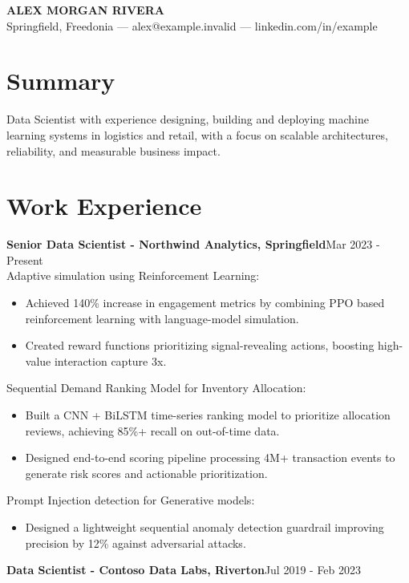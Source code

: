 \documentclass[10pt]{article}
\newcommand{\entry}[2]{{\bfseries #1}\hfill {#2}\\[-0.3em]}
\newcommand{\proj}[1]{\vspace{1pt}#1:\\[-0.4em]}
\begin{document}
\begin{center}
{\LARGE\bfseries ALEX MORGAN RIVERA}\\[2pt]
Springfield, Freedonia --- alex@example.invalid --- linkedin.com/in/example
\end{center}
\vspace{-4pt}

\section{Summary}
Data Scientist with experience designing, building and deploying machine learning systems in logistics and retail, with a focus on scalable architectures, reliability, and measurable business impact.

\section{Work Experience}
\entry{Senior Data Scientist - Northwind Analytics, Springfield}{Mar 2023 - Present}

\proj{Adaptive simulation using Reinforcement Learning}
\begin{itemize}
\item Achieved 140\% increase in engagement metrics by combining PPO based reinforcement learning with language-model simulation.
\item Created reward functions prioritizing signal-revealing actions, boosting high-value interaction capture 3x.
\end{itemize}

\proj{Sequential Demand Ranking Model for Inventory Allocation}
\begin{itemize}
\item Built a CNN + BiLSTM time-series ranking model to prioritize allocation reviews, achieving 85\%+ recall on out-of-time data.
\item Designed end-to-end scoring pipeline processing 4M+ transaction events to generate risk scores and actionable prioritization.
\end{itemize}

\proj{Prompt Injection detection for Generative models}
\begin{itemize}
\item Designed a lightweight sequential anomaly detection guardrail improving precision by 12\% against adversarial attacks.
\end{itemize}

\entry{Data Scientist - Contoso Data Labs, Riverton}{Jul 2019 - Feb 2023}
\end{document}
